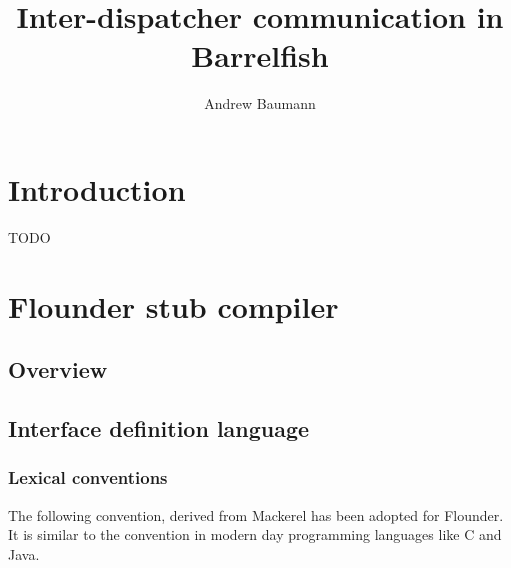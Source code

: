 \documentclass[a4paper,twoside]{report} %
\title{Inter-dispatcher communication in Barrelfish}   %
\author{Andrew Baumann}	%
\begin{document}
\maketitle

%
%
\begin{versionhistory}
\end{versionhistory}



\newcommand{\note}[1]{[\textcolor{red}{\emph{#1}}]}

\tableofcontents

\chapter{Introduction}

TODO

\chapter{Flounder stub compiler}\label{cha:flounder}

\section{Overview}

\section{Interface definition language}\label{sec:idl}

\subsection{Lexical conventions}
The following convention, derived from Mackerel\cite{btn002-mackerel} has
been adopted for Flounder. It is similar to the convention in modern
day programming languages like C and Java.
\end{document}
